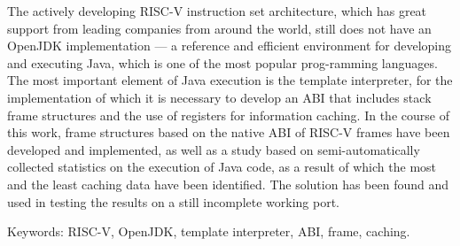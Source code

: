 \documentclass[14pt]{spbau-diploma}
\begin{document}
The actively developing RISC-V instruction set architecture, which has great support from leading companies from around the world, still does not have an OpenJDK implementation --- a reference and efficient environment for developing and executing Java, which is one of the most popular  prog-\newline ramming languages. The most important element of Java execution is the template interpreter, for the implementation of which it is necessary to develop an ABI that includes stack frame structures and the use of registers for information caching. In the course of this work, frame structures based on the native ABI of RISC-V frames have been developed and implemented, as well as a study based on semi-automatically collected statistics on the execution of Java code, as a result of which the most and the least caching data have been identified. The solution has been found and used in testing the results on a still incomplete working port.

\vspace*{1em}

Keywords: RISC-V, OpenJDK, template interpreter, ABI, frame, caching.
















\glsaddall
\printnoidxglossary[title=Глоссарий, toctitle=Глоссарий, style=altlist,nonumberlist]



\end{document}
